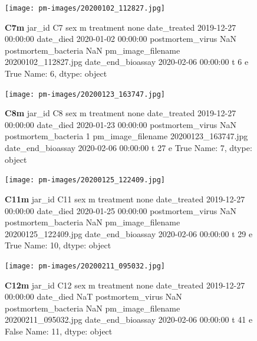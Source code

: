 \begin{figure}[h!]
\centering
\texttt{[image: pm-images/20200102\_112827.jpg]}
\caption{\textbf{C7m} jar\_id                                  C7
sex                                      m
treatment                             none
date\_treated           2019-12-27 00:00:00
date\_died              2020-01-02 00:00:00
postmortem\_virus                       NaN
postmortem\_bacteria                    NaN
pm\_image\_filename      20200102\_112827.jpg
date\_end\_bioassay      2020-02-06 00:00:00
t                                        6
e                                     True
Name: 6, dtype: object}
\end{figure}
\clearpage

\begin{figure}[h!]
\centering
\texttt{[image: pm-images/20200123\_163747.jpg]}
\caption{\textbf{C8m} jar\_id                                  C8
sex                                      m
treatment                             none
date\_treated           2019-12-27 00:00:00
date\_died              2020-01-23 00:00:00
postmortem\_virus                       NaN
postmortem\_bacteria                      1
pm\_image\_filename      20200123\_163747.jpg
date\_end\_bioassay      2020-02-06 00:00:00
t                                       27
e                                     True
Name: 7, dtype: object}
\end{figure}
\clearpage

\begin{figure}[h!]
\centering
\texttt{[image: pm-images/20200125\_122409.jpg]}
\caption{\textbf{C11m} jar\_id                                 C11
sex                                      m
treatment                             none
date\_treated           2019-12-27 00:00:00
date\_died              2020-01-25 00:00:00
postmortem\_virus                       NaN
postmortem\_bacteria                    NaN
pm\_image\_filename      20200125\_122409.jpg
date\_end\_bioassay      2020-02-06 00:00:00
t                                       29
e                                     True
Name: 10, dtype: object}
\end{figure}
\clearpage

\begin{figure}[h!]
\centering
\texttt{[image: pm-images/20200211\_095032.jpg]}
\caption{\textbf{C12m} jar\_id                                 C12
sex                                      m
treatment                             none
date\_treated           2019-12-27 00:00:00
date\_died                              NaT
postmortem\_virus                       NaN
postmortem\_bacteria                    NaN
pm\_image\_filename      20200211\_095032.jpg
date\_end\_bioassay      2020-02-06 00:00:00
t                                       41
e                                    False
Name: 11, dtype: object}
\end{figure}
\clearpage

